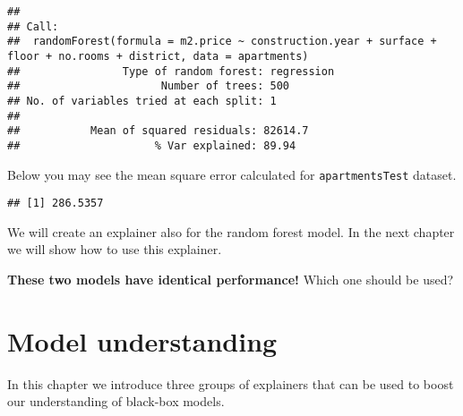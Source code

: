 \documentclass[]{book}
\newenvironment{Shaded}{\begin{snugshade}}{\end{snugshade}}
\newcommand{\DataTypeTok}[1]{\textcolor[rgb]{0.13,0.29,0.53}{#1}}
\newcommand{\DecValTok}[1]{\textcolor[rgb]{0.00,0.00,0.81}{#1}}
\newcommand{\KeywordTok}[1]{\textcolor[rgb]{0.13,0.29,0.53}{\textbf{#1}}}
\newcommand{\NormalTok}[1]{#1}
\newcommand{\OperatorTok}[1]{\textcolor[rgb]{0.81,0.36,0.00}{\textbf{#1}}}
\newcommand{\StringTok}[1]{\textcolor[rgb]{0.31,0.60,0.02}{#1}}
\theoremstyle{definition}
\theoremstyle{definition}
\theoremstyle{definition}
\theoremstyle{remark}
\begin{document}
\begin{verbatim}
## 
## Call:
##  randomForest(formula = m2.price ~ construction.year + surface +      floor + no.rooms + district, data = apartments) 
##                Type of random forest: regression
##                      Number of trees: 500
## No. of variables tried at each split: 1
## 
##           Mean of squared residuals: 82614.7
##                     % Var explained: 89.94
\end{verbatim}

Below you may see the mean square error calculated for
\texttt{apartmentsTest} dataset.

\begin{Shaded}
\end{Shaded}

\begin{verbatim}
## [1] 286.5357
\end{verbatim}

We will create an explainer also for the random forest model. In the
next chapter we will show how to use this explainer.

\begin{Shaded}
\end{Shaded}

\textbf{These two models have identical performance!} Which one should
be used?

\hypertarget{modelUnderstanding}{%
\chapter{Model understanding}\label{modelUnderstanding}}

In this chapter we introduce three groups of explainers that can be used
to boost our understanding of black-box models.
\end{document}
